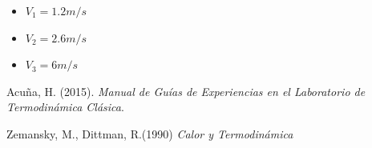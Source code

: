 \documentclass[12pt]{article}
\begin{document}
\begin{itemize}
\item $V_1 = 1.2 m/s $
\item $V_2 = 2.6 m/s $
\item $V_3 = 6 m/s  $
\end{itemize}




\begin{thebibliography}{6}


Acuña, H. (2015). \textit{Manual de Guías de Experiencias en el Laboratorio de Termodinámica Clásica}.

Zemansky, M., Dittman, R.(1990) \textit{Calor y Termodinámica}


\end{thebibliography}
\end{document}
